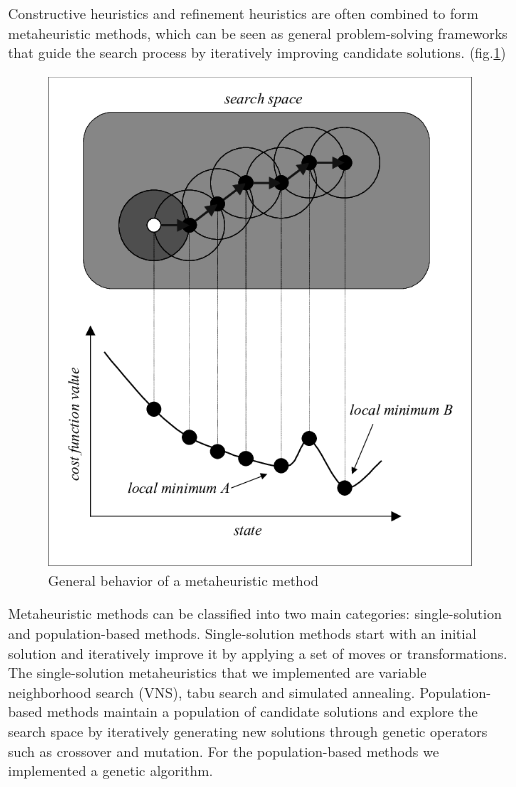 
Constructive heuristics and refinement heuristics  are often combined to form metaheuristic methods, which can be seen as general problem-solving frameworks that guide the search process by iteratively improving candidate solutions. (fig.\ref{fig:metaheur}) 

\begin{figure}[!h]
    \centering
    \includegraphics[]{images/metaheuristics.png}
    \caption{General behavior of a metaheuristic method}
    \label{fig:metaheur}
\end{figure}

Metaheuristic methods can be classified into two main categories: single-solution and population-based methods. Single-solution methods start with an initial solution and iteratively improve it by applying a set of moves or transformations. The single-solution metaheuristics that we implemented are variable neighborhood search (VNS), tabu search and simulated annealing. Population-based methods maintain a population of candidate solutions and explore the search space by iteratively generating new solutions through genetic operators such as crossover and mutation. For the population-based methods we implemented a genetic algorithm.





